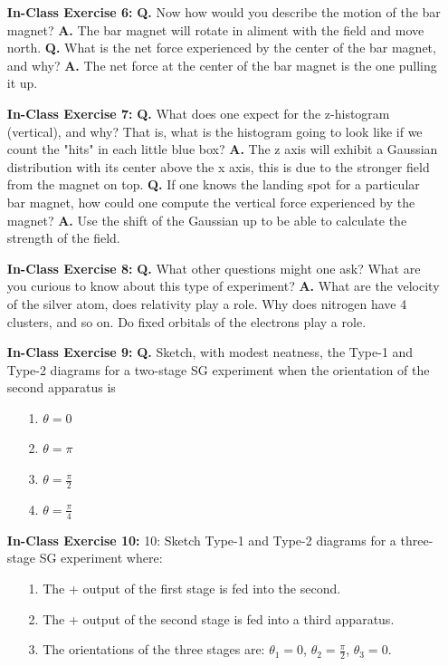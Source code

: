 \documentclass[main.tex]{subfiles}
\begin{document}
\begin{enumerate}
\item[] \textbf{In-Class Exercise 6:} \textbf{Q.} Now how would you describe the motion of the bar magnet? \textbf{A.} The bar magnet will rotate in aliment with the field and move north. \textbf{Q.} What is the net force experienced by the center of the bar magnet, and why? \textbf{A.} The net force at the center of the bar magnet is the one pulling it up.

\item[] \textbf{In-Class Exercise 7:} \textbf{Q.} What does one expect for the z-histogram (vertical), and why? That is, what is the histogram going to look like if we count the "hits" in each little blue box? \textbf{A.} The z axis will exhibit a Gaussian distribution with its center above the x axis, this is due to the stronger field from the magnet on top. \textbf{Q.} If one knows the landing spot for a particular bar magnet, how could one compute the vertical force experienced by the magnet? \textbf{A.} Use the shift of the Gaussian up to be able to calculate the strength of the field.

\item[] \textbf{In-Class Exercise 8:} \textbf{Q.} What other questions might one ask? What are you curious to know about this type of experiment? \textbf{A.} What are the velocity of the silver atom, does relativity play a role. Why does nitrogen have 4 clusters, and so on. Do fixed orbitals of the electrons play a role.

\item[] \textbf{In-Class Exercise 9:} \textbf{Q.} Sketch, with modest neatness, the Type-1 and Type-2 diagrams for a two-stage SG experiment when the orientation of the second apparatus is

    \begin{enumerate}
        \item[1.] $\theta=0$
        \item[2.] $\theta=\pi$
        \item[3.] $\theta=\frac{\pi}{2}$
        \item[4.] $\theta=\frac{\pi}{4}$
    \end{enumerate}

\item[] \textbf{In-Class Exercise 10:} 10: Sketch Type-1 and Type-2 diagrams for a three-stage SG experiment where:

    \begin{enumerate}
        \item[1.] The + output of the first stage is fed into the second.
        \item[2.] The + output of the second stage is fed into a third apparatus.
        \item[3.] The orientations of the three stages are: $\theta_{1}=0$, $\theta_{2}=\frac{\pi}{2}$, $\theta_{3}=0$.
    \end{enumerate}


\end{enumerate}
\end{document}
